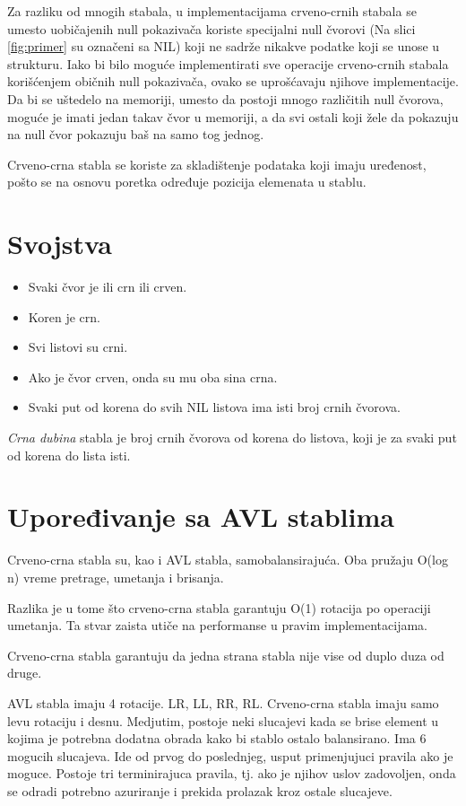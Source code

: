 \documentclass[a4paper]{article}
\begin{document}
Za razliku od mnogih stabala, u implementacijama crveno-crnih stabala se umesto uobičajenih null pokazivača koriste specijalni null čvorovi (Na slici \ref{fig:primer} su označeni sa NIL) koji ne sadrže nikakve podatke
koji se unose u strukturu. Iako bi bilo moguće implementirati sve operacije crveno-crnih stabala korišćenjem običnih null pokazivača, ovako se uprošćavaju njihove implementacije.
Da bi se uštedelo na memoriji, umesto da postoji mnogo različitih null čvorova, moguće je imati jedan takav čvor u memoriji, a da svi ostali koji žele da pokazuju na null čvor pokazuju
baš na samo tog jednog.

Crveno-crna stabla se koriste za skladištenje podataka koji imaju uređenost, pošto se na osnovu poretka određuje pozicija elemenata u stablu.
\section{Svojstva}
\label{sec:termini_i_citiranje}

\begin{itemize}
        \item Svaki čvor je ili crn ili crven.
        \item Koren je crn.
        \item Svi listovi su crni.
        \item Ako je čvor crven, onda su mu oba sina crna.
        \item Svaki put od korena do svih NIL listova ima isti broj crnih čvorova.
\end{itemize}

\textit{Crna dubina} stabla je broj crnih čvorova od korena do listova, koji je za svaki put od korena do lista isti.

\section{Upoređivanje sa AVL stablima}
    Crveno-crna stabla su, kao i AVL stabla, samobalansirajuća. Oba pružaju O(log n) vreme pretrage, umetanja i brisanja.

    Razlika je u tome što crveno-crna stabla garantuju O(1) rotacija po operaciji umetanja. 
    Ta stvar zaista utiče na performanse u pravim implementacijama.

    Crveno-crna stabla garantuju da jedna strana stabla nije vise od duplo duza od druge.

    AVL stabla imaju 4 rotacije. LR, LL, RR, RL.
    Crveno-crna stabla imaju samo levu rotaciju i desnu. Medjutim, postoje neki slucajevi kada se brise element u kojima je potrebna dodatna obrada
    kako bi stablo ostalo balansirano.
    Ima 6 mogucih slucajeva. Ide od prvog do poslednjeg, usput primenjujuci pravila ako je moguce. Postoje tri terminirajuca pravila, tj. 
    ako je njihov uslov zadovoljen, onda se odradi potrebno azuriranje i prekida prolazak kroz ostale slucajeve.
    
\end{document}
